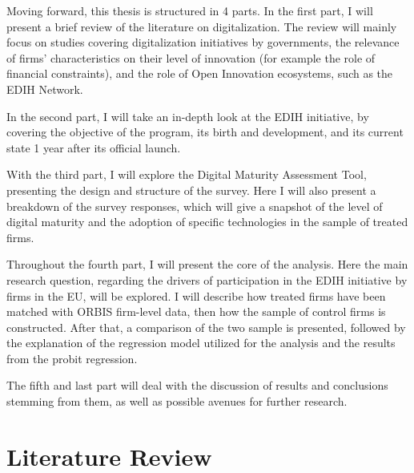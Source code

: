 \documentclass[12pt]{report}
\begin{document}
\par Moving forward, this thesis is structured in 4 parts. In the first part, I will present a brief review of the literature on digitalization. The review will mainly focus on studies covering digitalization initiatives by governments, the relevance of firms' characteristics on their level of innovation (for example the role of financial constraints), and the role of Open Innovation ecosystems, such as the EDIH Network.
\par In the second part, I will take an in-depth look at the EDIH initiative, by covering the objective of the program, its birth and development, and its current state 1 year after its official launch.
\par With the third part, I will explore the Digital Maturity Assessment Tool, presenting the design and structure of the survey. Here I will also present a breakdown of the survey responses, which will give a snapshot of the level of digital maturity and the adoption of specific technologies in the sample of treated firms.
\par Throughout the fourth part, I will present the core of the analysis. Here the main research question, regarding the drivers of participation in the EDIH initiative by firms in the EU, will be explored. I will describe how treated firms have been matched with ORBIS firm-level data, then how the sample of control firms is constructed. After that, a comparison of the two sample is presented, followed by the explanation of the regression model utilized for the analysis and the results from the probit regression.
\par The fifth and last part will deal with the discussion of results and conclusions stemming from them, as well as possible avenues for further research.






\newpage
\chapter{Literature Review}
\end{document}
